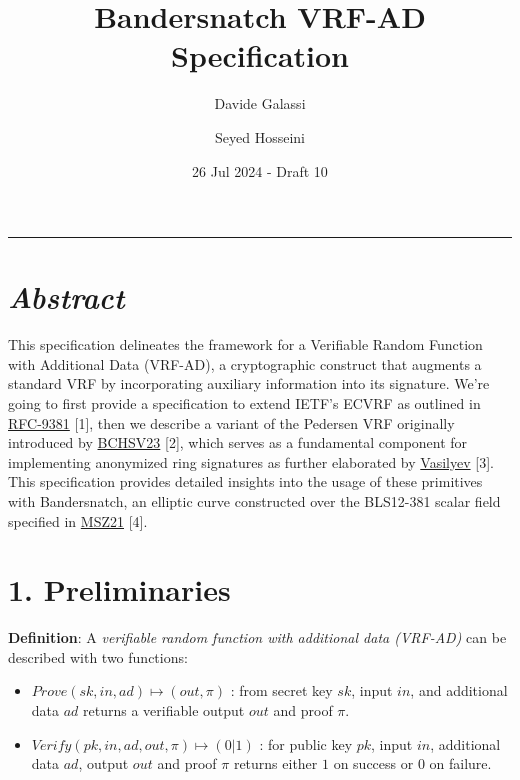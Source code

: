 \documentclass[
]{article}
\title{Bandersnatch VRF-AD Specification}
\author{Davide Galassi \and Seyed Hosseini}
\date{26 Jul 2024 - Draft 10}
\begin{document}
\maketitle

\newcommand{\G}{\langle G \rangle}
\newcommand{\F}{\mathbb{Z}^*_r}

\begin{center}\rule{0.5\linewidth}{0.5pt}\end{center}

\hypertarget{abstract}{%
\section{\texorpdfstring{\emph{Abstract}}{Abstract}}\label{abstract}}

This specification delineates the framework for a Verifiable Random
Function with Additional Data (VRF-AD), a cryptographic construct that
augments a standard VRF by incorporating auxiliary information into its
signature. We're going to first provide a specification to extend IETF's
ECVRF as outlined in
\href{https://datatracker.ietf.org/doc/rfc9381}{RFC-9381} {[}1{]}, then
we describe a variant of the Pedersen VRF originally introduced by
\href{https://eprint.iacr.org/2023/002}{BCHSV23} {[}2{]}, which serves
as a fundamental component for implementing anonymized ring signatures
as further elaborated by
\href{https://hackmd.io/ulW5nFFpTwClHsD0kusJAA}{Vasilyev} {[}3{]}. This
specification provides detailed insights into the usage of these
primitives with Bandersnatch, an elliptic curve constructed over the
BLS12-381 scalar field specified in
\href{https://eprint.iacr.org/2021/1152}{MSZ21} {[}4{]}.

\hypertarget{preliminaries}{%
\section{1. Preliminaries}\label{preliminaries}}

\textbf{Definition}: A \emph{verifiable random function with additional
data (VRF-AD)} can be described with two functions:

\begin{itemize}
\item
  \(Prove(sk,in,ad) \mapsto (out,\pi)\) : from secret key \(sk\), input
  \(in\), and additional data \(ad\) returns a verifiable output \(out\)
  and proof \(\pi\).
\item
  \(Verify(pk,in,ad,out,\pi) \mapsto (0|1)\) : for public key \(pk\),
  input \(in\), additional data \(ad\), output \(out\) and proof \(\pi\)
  returns either \(1\) on success or \(0\) on failure.
\end{itemize}
\end{document}
